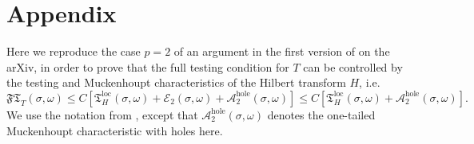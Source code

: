 \documentclass{amsart}%
\theoremstyle{plain}
\numberwithin{equation}{section}
\begin{document}
\section{Appendix}

Here we reproduce the case $p=2$ of an argument in the first version of
\cite{SaWi} on the arXiv, in order to prove that the full testing condition
for $T$ can be controlled by the testing and Muckenhoupt characteristics of
the Hilbert transform $H$, i.e.
\[
\mathfrak{FT}_{T}\left(  \sigma,\omega\right)  \leq C\left[  \mathfrak{T}%
_{H}^{\operatorname{loc}}\left(  \sigma,\omega\right)  +\mathcal{E}_{2}\left(
\sigma,\omega\right)  +\mathcal{A}_{2}^{\operatorname*{hole}}\left(
\sigma,\omega\right)  \right]  \leq C\left[  \mathfrak{T}_{H}%
^{\operatorname{loc}}\left(  \sigma,\omega\right)  +\mathcal{A}_{2}%
^{\operatorname*{hole}}\left(  \sigma,\omega\right)  \right]  .
\]
We use the notation from \cite{SaWi}, except that $\mathcal{A}_{2}%
^{\operatorname*{hole}}\left(  \sigma,\omega\right)  $ denotes the one-tailed
Muckenhoupt characteristic with holes here.
\end{document}
